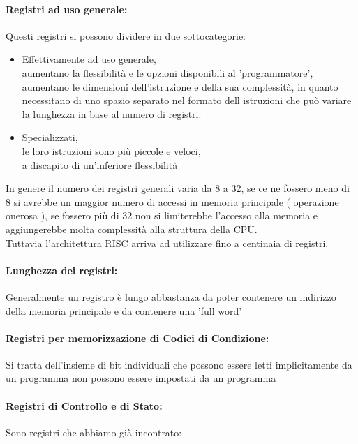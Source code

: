 \documentclass[arch.tex]{subfiles}
\begin{document}
\paragraph{Registri ad uso generale:}
Questi registri si possono dividere in due sottocategorie:

\begin{itemize}
	\item Effettivamente ad uso generale,\\
		aumentano la flessibilità e le opzioni disponibili al 'programmatore',\\
		aumentano le dimensioni dell'istruzione e della sua complessità, in quanto necessitano
		di uno spazio separato nel formato dell istruzioni che può variare la lunghezza 
		in base al numero di registri.
	\item Specializzati,\\
		le loro istruzioni sono più piccole e veloci,\\
		a discapito di un'inferiore flessibilità
\end{itemize}
In genere il numero dei registri generali varia da 8 a 32, se ce ne fossero meno di 8 si avrebbe un maggior
numero di accessi in memoria principale ( operazione onerosa ), se fossero più di 32 non si limiterebbe
l'accesso alla memoria e aggiungerebbe molta complessità alla struttura della CPU.\\
Tuttavia l'architettura RISC arriva ad utilizzare fino a centinaia di registri.\\

\paragraph{Lunghezza dei registri:}
Generalmente un registro è lungo abbastanza da poter contenere un indirizzo della memoria principale e 
da contenere una 'full word'

\paragraph{Registri per memorizzazione di Codici di Condizione:}
Si tratta dell'insieme di bit individuali che possono essere letti implicitamente da un programma
non possono essere impostati da un programma

\paragraph{Registri di Controllo e di Stato:}
Sono registri che abbiamo già incontrato:
\end{document}
